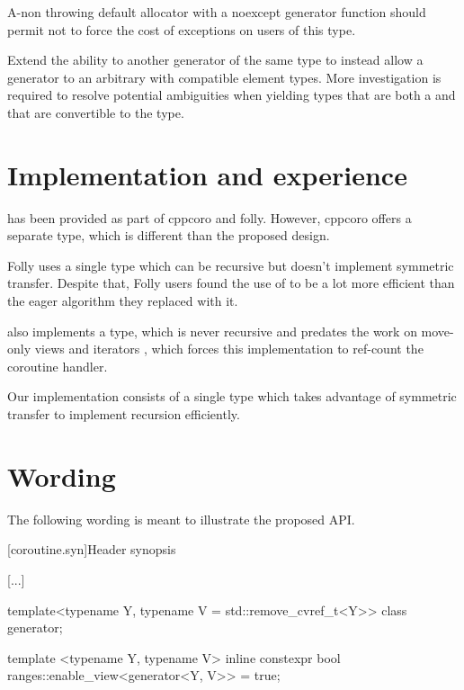 \documentclass{wg21}
\begin{document}
A-non throwing default allocator with a noexcept generator function should
permit not to force the cost of exceptions on users of this type.  

Extend the ability to  another generator of the same type to instead
allow a generator to  an arbitrary  with compatible
element types. More investigation is required to resolve potential ambiguities
when yielding types that are both a  and that are convertible to the
 type.

\section{Implementation and experience}

 has been provided as part of cppcoro and folly.
However, cppcoro offers a separate  type, which is different than the proposed design.

Folly uses a single  type which can be recursive but doesn't implement symmetric transfer. Despite that,
Folly users found the use of  to be a lot more efficient than the eager algorithm they replaced with it.

 also implements a  type, which is never recursive and predates the work on move-only views and
iterators \cite{P1456R1}, \cite{P1207R0} which forces this implementation to ref-count the coroutine handler.

Our implementation \cite{Implementation} consists of a single type which takes advantage of symmetric transfer to implement
recursion efficiently.

\section{Wording}

The following wording is meant to illustrate the proposed API.


[coroutine.syn]{Header  synopsis}

[...]

\begin{codeblock}
    
namespace std {

\end{codeblock}  

\begin{addedblock}
\begin{codeblock}  
template<typename Y, typename V  = std::remove_cvref_t<Y>>
class generator;

template <typename Y, typename V>
inline constexpr bool ranges::enable_view<generator<Y, V>> = true;

\end{codeblock}
\end{addedblock}
\begin{codeblock}
    
}
\end{codeblock}
\end{document}
